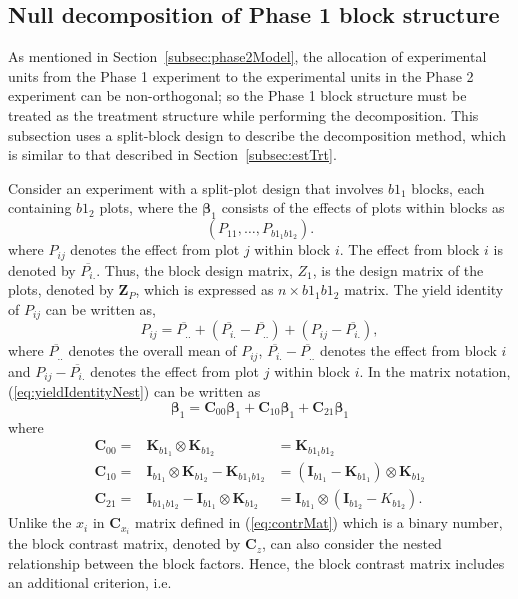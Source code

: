 \documentclass[article]{jss}
\newcommand{\I}{\mathbf{I}}
\newcommand{\K}{\mathbf{K}}
\newcommand{\Z}{\mathbf{Z}}
\newcommand{\C}{\mathbf{C}}
\begin{document}
\subsection{Null decomposition of Phase 1 block structure}
As mentioned in Section~\ref{subsec:phase2Model}, the allocation of experimental units from the Phase 1 experiment to the experimental units in the Phase 2 experiment can be non-orthogonal; so the Phase 1 block structure must be treated as the treatment structure while performing the decomposition. This subsection uses a split-block design to describe the decomposition method, which is similar to that described in Section~\ref{subsec:estTrt}.

Consider an experiment with a split-plot design that involves $b1_1$ blocks, each containing $b1_2$ plots, where the $\bm{\beta}_1$ consists of the effects of plots within blocks as    
\begin{equation}\label{eq:blockParSplitBlk1}
 (P_{11}, \dots, P_{b1_1 b1_2}). 
\end{equation}
where $P_{ij}$ denotes the effect from plot $j$ within block $i$. The effect from block $i$ is denoted by $\overline{P_{i.}}$. Thus, the block design matrix, $Z_1$, is the design matrix of the plots, denoted by $\Z_P$, which is expressed as $n \times b1_1 b1_2$ matrix. The yield identity of $P_{ij}$ can be written as,
\begin{equation}
\label{eq:yieldIdentityNest}
P_{ij} = \overline{P_{..}}+(\overline{P_{i.}} -\overline{P_{..}}) + (P_{ij} - \overline{P_{i.}}),
\end{equation}
where $\overline{P_{..}}$ denotes the overall mean of $P_{ij}$, $\overline{P_{i.}} -\overline{P_{..}}$ denotes the effect from block $i$ and $P_{ij} - \overline{P_{i.}}$ denotes the effect from plot $j$ within block $i$. In the matrix notation, (\ref{eq:yieldIdentityNest}) can be written as 
\[
\bm{\beta}_1 = \C_{00} \bm{\beta}_1 + \C_{10}\bm{\beta}_1 + \C_{21}\bm{\beta}_1
\]
where
\begin{eqnarray}
\nonumber \C_{00} = & \K_{b1_1} \otimes \K_{b1_2}& = \K_{b1_1 b1_2}\\
\nonumber \C_{10} = & \I_{b1_1} \otimes \K_{b1_2} - \K_{b1_1 b1_2}& = (\I_{b1_1} - \K_{b1_1}) \otimes \K_{b1_2} \\
\nonumber \C_{21} = & \I_{b1_1 b1_2} - \I_{b1_1} \otimes \K_{b1_2} & =  \I_{b1_1} \otimes (\I_{b1_2} - K_{b1_2}).
\end{eqnarray}
Unlike the $x_i$ in $\C_{x_i}$ matrix defined in (\ref{eq:contrMat}) which is a binary number, the block contrast matrix, denoted by $\C_z$, can also consider the nested relationship between the block factors. Hence, the block contrast matrix includes an additional criterion, i.e.\
\end{document}
